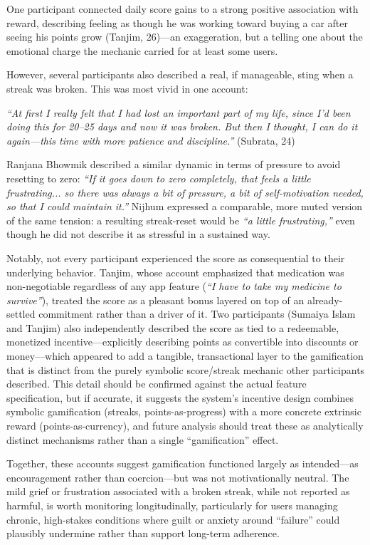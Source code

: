 \documentclass[acmlarge]{acmart}
\begin{document}
One participant connected daily score gains to a strong positive
association with reward, describing feeling as though he was working
toward buying a car after seeing his points grow (Tanjim, 26)---an
exaggeration, but a telling one about the emotional charge the mechanic
carried for at least some users.

However, several participants also described a real, if manageable, sting
when a streak was broken. This was most vivid in one account:

\emph{``At first I really felt that I had lost an important part of my
life, since I'd been doing this for 20--25 days and now it was broken. But
then I thought, I can do it again---this time with more patience and
discipline.''} (Subrata, 24)

Ranjana Bhowmik described a similar dynamic in terms of pressure to avoid
resetting to zero: \emph{``If it goes down to zero completely, that feels a
little frustrating... so there was always a bit of pressure, a bit of
self-motivation needed, so that I could maintain it.''} Nijhum expressed a
comparable, more muted version of the same tension: a resulting streak-reset
would be \emph{``a little frustrating,''} even though he did not describe it
as stressful in a sustained way.

Notably, not every participant experienced the score as consequential to
their underlying behavior. Tanjim, whose account emphasized that medication
was non-negotiable regardless of any app feature (\emph{``I have to take my
medicine to survive''}), treated the score as a pleasant bonus layered on
top of an already-settled commitment rather than a driver of it. Two
participants (Sumaiya Islam and Tanjim) also independently described the
score as tied to a redeemable, monetized incentive---explicitly describing
points as convertible into discounts or money---which appeared to add a
tangible, transactional layer to the gamification that is distinct from the
purely symbolic score/streak mechanic other participants described. This
detail should be confirmed against the actual feature specification, but if
accurate, it suggests the system's incentive design combines symbolic
gamification (streaks, points-as-progress) with a more concrete
extrinsic reward (points-as-currency), and future analysis should treat
these as analytically distinct mechanisms rather than a single
``gamification'' effect.

Together, these accounts suggest gamification functioned largely as
intended---as encouragement rather than coercion---but was not
motivationally neutral. The mild grief or frustration associated with a
broken streak, while not reported as harmful, is worth monitoring
longitudinally, particularly for users managing chronic, high-stakes
conditions where guilt or anxiety around ``failure'' could plausibly
undermine rather than support long-term adherence.
\end{document}
